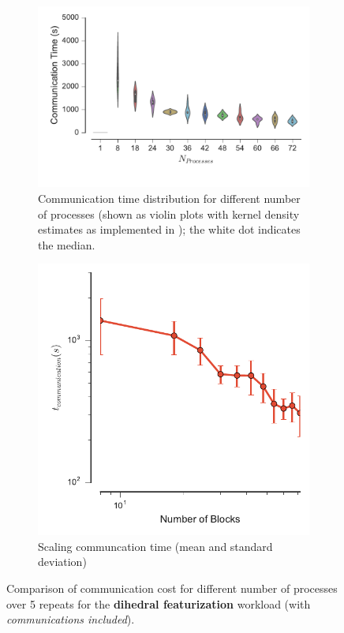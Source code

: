 \begin{figure}[tbp]
\centering
\begin{subfigure} {.55\textwidth}
  \centering
  \includegraphics[width=\linewidth]{figs/ViolinPlot-Ncores-comparison-comm-dihedral.pdf}
  \caption{Communication time distribution for different number of
    processes (shown as violin plots \protect\cite{Hintze:1998tw}
    with kernel density estimates as implemented in
    ); the white dot indicates the median.}
\end{subfigure}
\hfill
\begin{subfigure}{.35\textwidth}
  \centering
  \includegraphics[width=\linewidth]{figs/t_comm-mean-dihedral.pdf}
  \caption{Scaling communcation time (mean and standard deviation)}
\end{subfigure}
\caption{Comparison of communication cost for different number of
  processes over 5 repeats for the \textbf{dihedral featurization}
  workload (with \emph{communications included}).}
\label{fig:comparison-t_comm-dihedral}
\end{figure}

